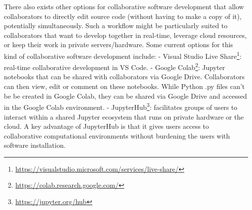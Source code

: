 \documentclass[
]{krantz}
\renewcommand{\href}[2]{#2\footnote{\url{#1}}}
\begin{document}
There also exists other options for collaborative software development that allow collaborators to directly edit source code (without having to make a copy of it), potentially simultaneously. Such a workflow might be particularly suited to collaborators that want to develop together in real-time, leverage cloud resources, or keep their work in private servers/hardware. Some current options for this kind of collaborative software development include:
- \href{https://visualstudio.microsoft.com/services/live-share/}{Visual Studio Live Share}: real-time collaborative development in VS Code.
- \href{https://colab.research.google.com/}{Google Colab}: Jupyter notebooks that can be shared with collaborators via Google Drive. Collaborators can then view, edit or comment on these notebooks. While Python .py files can't be be created in Google Colab, they can be shared via Google Drive and accessed in the Google Colab environment.
- \href{https://jupyter.org/hub}{JupyterHub}: facilitates groups of users to interact within a shared Jupyter ecosystem that runs on private hardware or the cloud. A key advantage of JupyterHub is that it gives users access to collaborative computational environments without burdening the users with software installation.

  

\backmatter
\printindex
\end{document}
